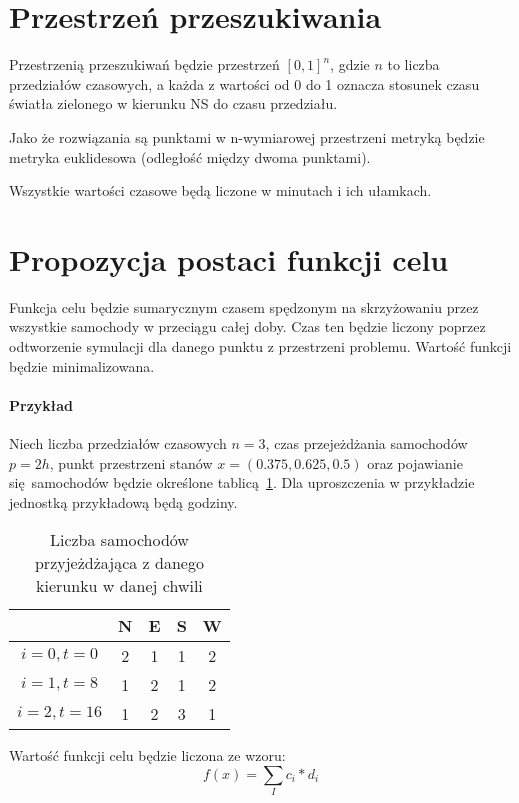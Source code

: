 \documentclass[a4paper]{article}
\begin{document}
\section{Przestrzeń przeszukiwania}
Przestrzenią przeszukiwań będzie przestrzeń $[0, 1]^n$, gdzie $n$ to liczba
przedziałów czasowych, a każda z wartości od 0 do 1 oznacza stosunek czasu światła
zielonego w kierunku NS do czasu przedziału.

Jako że rozwiązania są punktami w n-wymiarowej przestrzeni metryką będzie
metryka euklidesowa (odległość między dwoma punktami).


Wszystkie wartości czasowe będą liczone w minutach i ich ułamkach.

\section{Propozycja postaci funkcji celu}
Funkcja celu będzie sumarycznym czasem spędzonym na skrzyżowaniu przez wszystkie
samochody w przeciągu całej doby. Czas ten będzie liczony poprzez odtworzenie
symulacji dla danego punktu z przestrzeni problemu. Wartość funkcji będzie
minimalizowana.

\paragraph{Przykład} Niech liczba przedziałów czasowych $n=3$, czas
przejeżdżania samochodów $p=2h$, punkt przestrzeni stanów $x=(0.375, 0.625, 0.5)$
oraz pojawianie się samochodów będzie określone tablicą~\ref{tab:example}.
Dla uproszczenia w przykładzie jednostką przykładową będą godziny.

\begin{table}[ht]
    \centering
    \begin{tabular}{| c | c | c | c | c |}
        \hline
         & N & E & S & W \\ \hline
         $i=0, t=0$ & 2 & 1 & 1 & 2\\ \hline
         $i=1, t=8$ & 1 & 2 & 1 & 2\\ \hline
         $i=2, t=16$ & 1 & 2 & 3 & 1\\ \hline
    \end{tabular}
    \caption{Liczba samochodów przyjeżdżająca z danego kierunku w danej chwili\label{tab:example}}
\end{table}

Wartość funkcji celu będzie liczona ze wzoru:
$$f(x) = \sum\limits_{I} c_i * d_i $$
\end{document}
